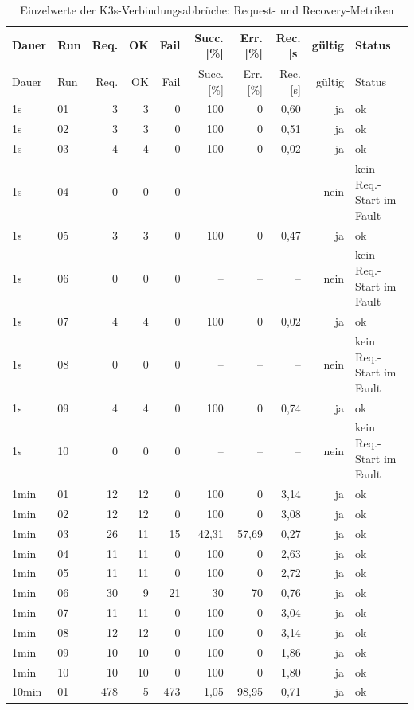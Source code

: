 \begin{longtable}{llrrrrrrrl}
\caption{Einzelwerte der K3s-Verbindungsabbrüche: Request- und Recovery-Metriken}\label{tab:appendix-k3s-link-cut-requests}\\
\toprule
Dauer & Run & Req. & OK & Fail & Succ. [\%] & Err. [\%] & Rec. [s] & gültig & Status \\
\midrule
\endfirsthead
\toprule
Dauer & Run & Req. & OK & Fail & Succ. [\%] & Err. [\%] & Rec. [s] & gültig & Status \\
\midrule
\endhead
1s & 01 & 3 & 3 & 0 & 100 & 0 & 0,60 & ja & ok \\
1s & 02 & 3 & 3 & 0 & 100 & 0 & 0,51 & ja & ok \\
1s & 03 & 4 & 4 & 0 & 100 & 0 & 0,02 & ja & ok \\
1s & 04 & 0 & 0 & 0 & -- & -- & -- & nein & kein Req.-Start im Fault \\
1s & 05 & 3 & 3 & 0 & 100 & 0 & 0,47 & ja & ok \\
1s & 06 & 0 & 0 & 0 & -- & -- & -- & nein & kein Req.-Start im Fault \\
1s & 07 & 4 & 4 & 0 & 100 & 0 & 0,02 & ja & ok \\
1s & 08 & 0 & 0 & 0 & -- & -- & -- & nein & kein Req.-Start im Fault \\
1s & 09 & 4 & 4 & 0 & 100 & 0 & 0,74 & ja & ok \\
1s & 10 & 0 & 0 & 0 & -- & -- & -- & nein & kein Req.-Start im Fault \\
1min & 01 & 12 & 12 & 0 & 100 & 0 & 3,14 & ja & ok \\
1min & 02 & 12 & 12 & 0 & 100 & 0 & 3,08 & ja & ok \\
1min & 03 & 26 & 11 & 15 & 42,31 & 57,69 & 0,27 & ja & ok \\
1min & 04 & 11 & 11 & 0 & 100 & 0 & 2,63 & ja & ok \\
1min & 05 & 11 & 11 & 0 & 100 & 0 & 2,72 & ja & ok \\
1min & 06 & 30 & 9 & 21 & 30 & 70 & 0,76 & ja & ok \\
1min & 07 & 11 & 11 & 0 & 100 & 0 & 3,04 & ja & ok \\
1min & 08 & 12 & 12 & 0 & 100 & 0 & 3,14 & ja & ok \\
1min & 09 & 10 & 10 & 0 & 100 & 0 & 1,86 & ja & ok \\
1min & 10 & 10 & 10 & 0 & 100 & 0 & 1,80 & ja & ok \\
10min & 01 & 478 & 5 & 473 & 1,05 & 98,95 & 0,71 & ja & ok \\

\end{longtable}

